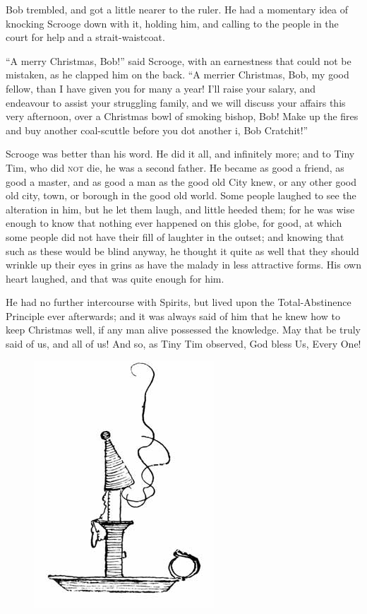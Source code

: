 \documentclass[paper=5.5in:8.5in,BCOR=10mm,twoside,DIV=15,12pt,usegeometry,openany]{scrbook} %
\begin{document}
Bob trembled, and got a little nearer to the ruler. He had a momentary idea of knocking Scrooge down with it, holding him, and calling to the people in the court for help and a strait-waistcoat.

\enquote{A merry Christmas, Bob!} said Scrooge, with an earnestness that could not be mistaken, as he clapped him on the back. \enquote{A merrier Christmas, Bob, my good fellow, than I have given you for many a year! I'll raise your salary, and endeavour to assist your struggling family, and we will discuss your affairs this very afternoon, over a Christmas bowl of smoking bishop, Bob! Make up the fires and buy another coal-scuttle before you dot another i, Bob Cratchit!}

Scrooge was better than his word. He did it all, and infinitely more; and to Tiny Tim, who did \textsc{not} die, he was a second father. He became as good a friend, as good a master, and as good a man as the good old City knew, or any other good old city, town, or borough in the good old world. Some people laughed to see the alteration in him, but he let them laugh, and little heeded them; for he was wise enough to know that nothing ever happened on this globe, for good, at which some people did not have their fill of laughter in the outset; and knowing that such as these would be blind anyway, he thought it quite as well that they should wrinkle up their eyes in grins as have the malady in less attractive forms. His own heart laughed, and that was quite enough for him.

He had no further intercourse with Spirits, but lived upon the Total-Abstinence Principle ever afterwards; and it was always said of him that he knew how to keep Christmas well, if any man alive possessed the knowledge. May that be truly said of us, and all of us! And so, as Tiny Tim observed, God bless Us, Every One!

\begin{figure}[tbh]
\centering
\includegraphics[width=.5\linewidth]{gs182}
\end{figure}
\end{document}
